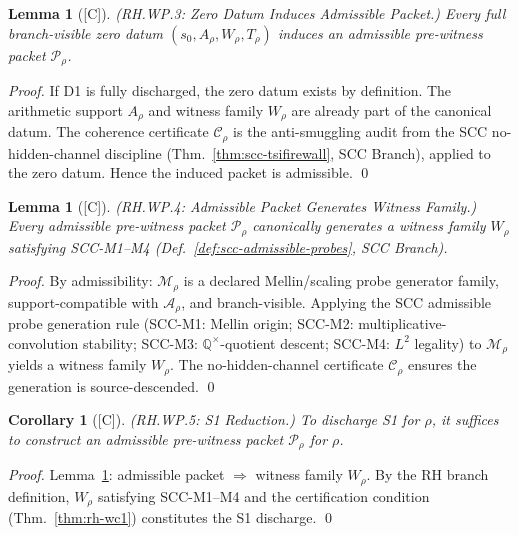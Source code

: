 \documentclass[12pt,oneside]{amsbook}
\theoremstyle{plain}
\newtheorem{lemma}[theorem]{Lemma}
\newtheorem{corollary}[theorem]{Corollary}
\theoremstyle{definition}
\theoremstyle{remark}
\newcommand{\status}[1]{\textup{[#1]}}
\begin{document}
\begin{lemma}[\status{C}]\label{lem:rh-wp3}
\textup{(RH.WP.3: Zero Datum Induces Admissible Packet.)}
Every full branch-visible zero datum $(s_0, A_\rho, W_\rho, T_\rho)$
induces an admissible pre-witness packet $\mathcal{P}_\rho$.
\end{lemma}

\begin{proof}
If D1 is fully discharged, the zero datum exists by definition.
The arithmetic support $A_\rho$ and witness family $W_\rho$ are
already part of the canonical datum. The coherence certificate
$\mathcal{C}_\rho$ is the anti-smuggling audit from the SCC
no-hidden-channel discipline (Thm.~\ref{thm:scc-tsifirewall},
SCC Branch), applied to the zero datum. Hence the induced packet
is admissible. \qed
\end{proof}

\begin{lemma}[\status{C}]\label{lem:rh-wp4}
\textup{(RH.WP.4: Admissible Packet Generates Witness Family.)}
Every admissible pre-witness packet $\mathcal{P}_\rho$ canonically
generates a witness family $W_\rho$ satisfying SCC-M1--M4
(Def.~\ref{def:scc-admissible-probes}, SCC Branch).
\end{lemma}

\begin{proof}
By admissibility: $\mathcal{M}_\rho$ is a declared Mellin/scaling
probe generator family, support-compatible with $\mathcal{A}_\rho$,
and branch-visible. Applying the SCC admissible probe generation
rule (SCC-M1: Mellin origin; SCC-M2: multiplicative-convolution
stability; SCC-M3: $\mathbb{Q}^\times$-quotient descent; SCC-M4:
$L^2$ legality) to $\mathcal{M}_\rho$ yields a witness family
$W_\rho$. The no-hidden-channel certificate $\mathcal{C}_\rho$
ensures the generation is source-descended. \qed
\end{proof}

\begin{corollary}[\status{C}]\label{cor:rh-wp5}
\textup{(RH.WP.5: S1 Reduction.)}
To discharge S1 for $\rho$, it suffices to construct an admissible
pre-witness packet $\mathcal{P}_\rho$ for $\rho$.
\end{corollary}

\begin{proof}
Lemma~\ref{lem:rh-wp4}: admissible packet $\Rightarrow$ witness
family $W_\rho$. By the RH branch definition, $W_\rho$ satisfying
SCC-M1--M4 and the certification condition
(Thm.~\ref{thm:rh-wc1}) constitutes the S1 discharge. \qed
\end{proof}
\end{document}
